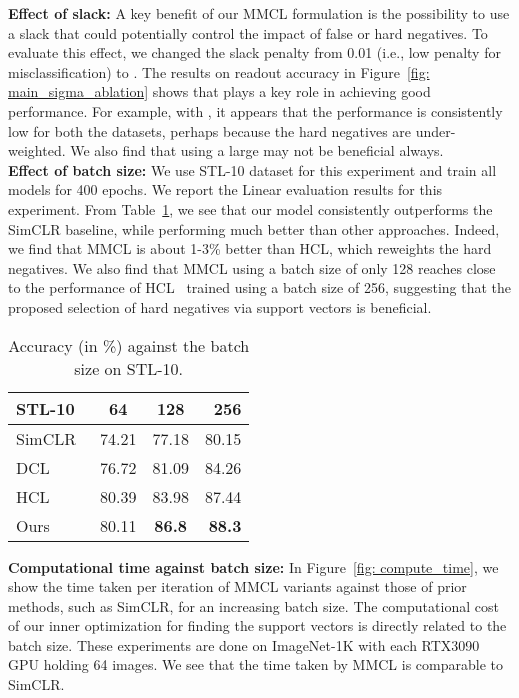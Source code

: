 \documentclass[letterpaper]{article} \usepackage{aaai22}  \usepackage{times}  \usepackage{helvet}  \usepackage{courier}  \usepackage[hyphens]{url}  \usepackage{graphicx} \urlstyle{rm} \def\UrlFont{\rm}  \usepackage{natbib}  \usepackage{caption} \DeclareCaptionStyle{ruled}{labelfont=normalfont,labelsep=colon,strut=off} \frenchspacing  \setlength{\pdfpagewidth}{8.5in}  \setlength{\pdfpageheight}{11in}
\begin{document}
\noindent\textbf{Effect of slack:} A key benefit of our MMCL formulation is the possibility to use a slack that could potentially control the impact of false or hard negatives. To evaluate this effect,  we changed the slack penalty  from 0.01 (i.e., low penalty for misclassification) to . The results on readout accuracy in Figure~\ref{fig: main_sigma_ablation} shows that  plays a key role in achieving good performance. For example, with , it appears that the performance is consistently low for both the datasets, perhaps because the hard negatives are under-weighted. We also find that using a large  may not be beneficial always.
\\
\noindent\textbf{Effect of batch size:}
We use STL-10 dataset for this experiment and train all models for 400 epochs. We report the Linear evaluation results for this experiment. From Table~\ref{tab: small_datasets_sota}, we see that our model consistently outperforms the SimCLR baseline, while performing much better than other approaches. Indeed, we find that MMCL is about 1-3\% better than HCL, which reweights the hard negatives. We also find that MMCL using a batch size of only 128 reaches close to the performance of HCL~\cite{robinson2021contrastive} trained using a batch size of 256, suggesting that the proposed selection of hard negatives via support vectors is beneficial. 
\\
\begin{table}[]
    \centering
    \begin{tabular}{lccr}
            \toprule
            STL-10  & 64 & 128 & 256  \\
            \midrule
            SimCLR~\cite{chen2020simple}  & 74.21 & 77.18 &  80.15  \\
           DCL~\cite{chuang2020debiased}  & 76.72 & 81.09 & 84.26     \\
          HCL~\cite{robinson2021contrastive}  & 80.39 & 83.98 & 87.44   \\
            \midrule
            Ours  & 80.11 & \textbf{86.8} & \textbf{88.3} \\
            \bottomrule
            \end{tabular}
    \caption{Accuracy (in \%) against the batch size on STL-10.}
    \label{tab: small_datasets_sota}
\end{table}
\noindent\textbf{Computational time against batch size:}
In Figure~\ref{fig: compute_time}, we show the time taken per iteration of MMCL variants against those of prior methods, such as SimCLR, for an increasing batch size. The computational cost of our inner optimization for finding the support vectors is directly related to the batch size. These experiments are done on ImageNet-1K with each RTX3090 GPU holding 64 images. We see that the time taken by MMCL is comparable to SimCLR.
\end{document}
